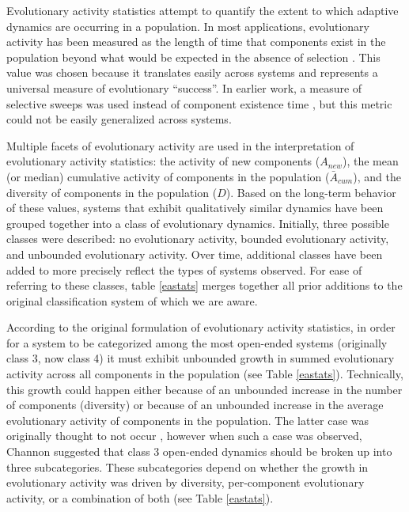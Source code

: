 \documentclass[letterpaper]{article}
\begin{document}
Evolutionary activity statistics attempt
to quantify the extent to which adaptive dynamics are occurring in a population. In most applications, evolutionary activity has been measured as the length of time that components exist in the population
beyond what would be expected in the absence of selection
\citep{bedau_comparison_1997, bedau_classification_1998, channon_improving_2003}. This value was chosen because it translates easily across systems and %
represents a universal measure of evolutionary ``success''.
In earlier work, a measure of selective sweeps was used instead of component existence time \citep{langton_measurement_1992}, but this metric could not be easily generalized across systems.


Multiple facets of evolutionary activity are used in the interpretation of evolutionary activity statistics: the activity of new components ($A_{new}$), the mean (or median) cumulative activity of components in the population ($\bar{A}_{cum}$), and the diversity of components in the population ($D$). Based on the long-term behavior of these values, systems that exhibit qualitatively similar dynamics have been grouped together into a class of evolutionary dynamics. Initially, three possible classes were described: no evolutionary activity, bounded evolutionary activity, and unbounded evolutionary activity. Over time, additional classes have been added to more precisely reflect the types of systems observed. For ease of referring to these classes, table \ref{eastats} merges together all prior additions to the original classification system of which we are aware.



According to the original formulation of evolutionary activity statistics, in order for a system to be categorized among the most open-ended systems (originally class 3, now class 4) it must exhibit unbounded growth in summed evolutionary activity across all components in the population \citep{bedau_comparison_1997} (see Table \ref{eastats}). Technically, this growth could happen either because of an unbounded increase in the number of components (diversity) or because of an unbounded increase in the average evolutionary activity of components in the population. The latter case was originally thought to not occur \citep{bedau_classification_1998}, however when such a case was observed, Channon suggested that class 3 open-ended dynamics should be broken up into three subcategories.  These subcategories depend on whether the growth in evolutionary activity was driven by diversity, per-component evolutionary activity, or a combination of both \citep{channon_passing_2001} (see Table \ref{eastats}). 
\end{document}
